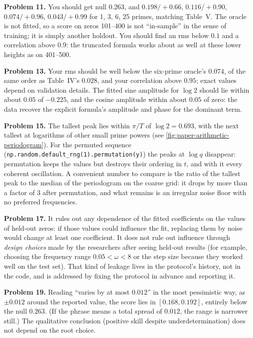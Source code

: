 \textbf{Problem 11.} You should get null $0.263$, and $0.198/+0.66$, $0.116/+0.90$, $0.074/+0.96$, $0.043/+0.99$ for 1, 3, 6, 25 primes, matching Table~V. The oracle is not fitted, so a score on zeros 101--400 is not ``in-sample'' in the sense of training; it is simply another holdout. You should find an rms below $0.1$ and a correlation above $0.9$: the truncated formula works about as well at these lower heights as on 401--500.

\textbf{Problem 13.} Your rms should be well below the six-prime oracle's $0.074$, of the same order as Table~IV's $0.028$, and your correlation above $0.95$; exact values depend on validation details. The fitted sine amplitude for $\log2$ should lie within about $0.05$ of $-0.225$, and the cosine amplitude within about $0.05$ of zero: the data recover the explicit formula's amplitude and phase for the dominant term.

\textbf{Problem 15.} The tallest peak lies within $\pi/T$ of $\log2=0.693$, with the next tallest at logarithms of other small prime powers (see \cref{fig:paper-arithmetic-periodogram}). For the permuted sequence (\texttt{np.random.default\_rng(1).permutation(y)}) the peaks at $\log q$ disappear: permutation keeps the values but destroys their ordering in $t$, and with it every coherent oscillation. A convenient number to compare is the ratio of the tallest peak to the median of the periodogram on the coarse grid: it drops by more than a factor of 3 after permutation, and what remains is an irregular noise floor with no preferred frequencies.

\textbf{Problem 17.} It rules out any dependence of the fitted coefficients on the values of held-out zeros: if those values could influence the fit, replacing them by noise would change at least one coefficient. It does not rule out influence through \emph{design choices} made by the researchers after seeing held-out results (for example, choosing the frequency range $0.05<\omega<8$ or the step size because they worked well on the test set). That kind of leakage lives in the protocol's history, not in the code, and is addressed by fixing the protocol in advance and reporting it.

\textbf{Problem 19.} Reading ``varies by at most $0.012$'' in the most pessimistic way, as $\pm0.012$ around the reported value, the score lies in $[0.168,0.192]$, entirely below the null $0.263$. (If the phrase means a total spread of $0.012$, the range is narrower still.) The qualitative conclusion (positive skill despite underdetermination) does not depend on the root choice.

